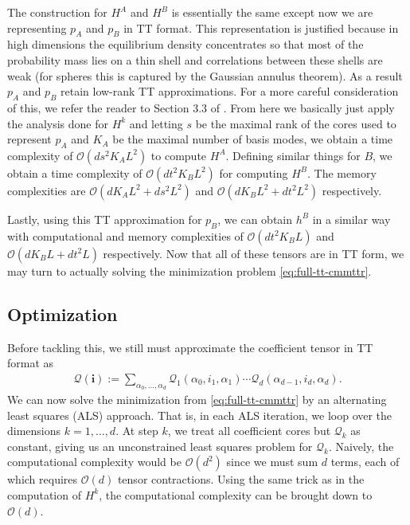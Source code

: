 \documentclass[11pt]{amsart}
\begin{document}
The construction for $H^A$ and $H^B$ is essentially the same except now we are representing $p_A$ and $p_B$ in TT format. This representation is justified because in high dimensions the equilibrium density concentrates so that most of the probability mass lies on a thin shell and correlations between these shells are weak (for spheres this is captured by the Gaussian annulus theorem). As a result $p_A$ and $p_B$ retain  low-rank TT approximations. For a more careful consideration of this, we refer the reader to Section 3.3 of \cite{committor}. From here we basically just apply the analysis done for $H^k$ and letting $s$ be the maximal rank of the cores used to represent $p_A$ and $K_A$ be the maximal number of basis modes, we obtain a time complexity of $\mathcal{O}(ds^2K_AL^2)$ to compute $H^A$. Defining similar things for $B$, we obtain a time complexity of $\mathcal{O}(dt^2K_BL^2)$ for computing $H^B$. The memory complexities are $\mathcal{O}(dK_AL^2+ds^2L^2)$ and $\mathcal{O}(dK_BL^2+dt^2L^2)$ respectively.

Lastly, using this TT approximation for $p_B$, we can obtain $h^B$ in a similar way with computational and memory complexities of $\mathcal{O}(dt^2K_BL)$ and $\mathcal{O}(dK_BL+dt^2L)$ respectively. Now that all of these tensors are in TT form, we may turn to actually solving the minimization problem \cref{eq:full-tt-cmmttr}.

\subsection{Optimization}
Before tackling this, we still must approximate the coefficient tensor in TT format as
\begin{align}
    \mathcal{Q}(\boldsymbol{i}):=\sum_{\alpha_0,\ldots,\alpha_d}\mathcal{Q}_1(\alpha_0,i_1,\alpha_1)\cdots\mathcal{Q}_d(\alpha_{d-1},i_d,\alpha_d).
\end{align}
We can now solve the minimization from \cref{eq:full-tt-cmmttr} by an alternating least squares (ALS) approach. That is, in each ALS iteration, we loop over the dimensions $k=1,\ldots,d$. At step $k$, we treat all coefficient cores but $\mathcal{Q}_k$ as constant, giving us an unconstrained least squares problem for $\mathcal{Q}_k$. Naively, the computational complexity would be $\mathcal{O}(d^2)$ since we must sum $d$ terms, each of which requires $\mathcal{O}(d)$ tensor contractions. Using the same trick as in the computation of $H^k$, the computational complexity can be brought down to $\mathcal{O}(d)$.
\end{document}
